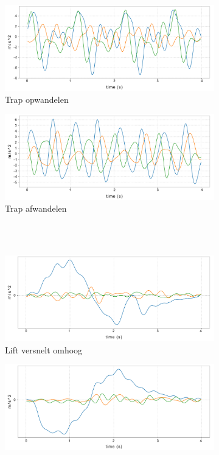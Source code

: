 \documentclass{article}
\begin{document}
\begin{figure}[h!]
\begin{subfigure}[b]{.49\linewidth}
  \end{subfigure} \\~\\
  \begin{subfigure}[b]{.49\linewidth}
    \centering
    \includegraphics[width=.70\textwidth]{figures/trapop}
    \caption{Trap opwandelen}\label{fig:1e}
  \end{subfigure} 
  \begin{subfigure}[b]{.49\linewidth}
    \centering 
    \includegraphics[width=.70\textwidth]{figures/trapaf}
    \caption{Trap afwandelen}\label{fig:1f}
  \end{subfigure} \\~\\
  \begin{subfigure}[b]{.49\linewidth}
    \centering
    \includegraphics[width=.70\textwidth]{figures/liftau}
    \caption{Lift versnelt omhoog}\label{fig:1g}
  \end{subfigure}
  \begin{subfigure}[b]{.49\linewidth}
    \centering
    \includegraphics[width=.70\textwidth]{figures/liftad}

\end{subfigure}
\end{figure}
\end{document}
